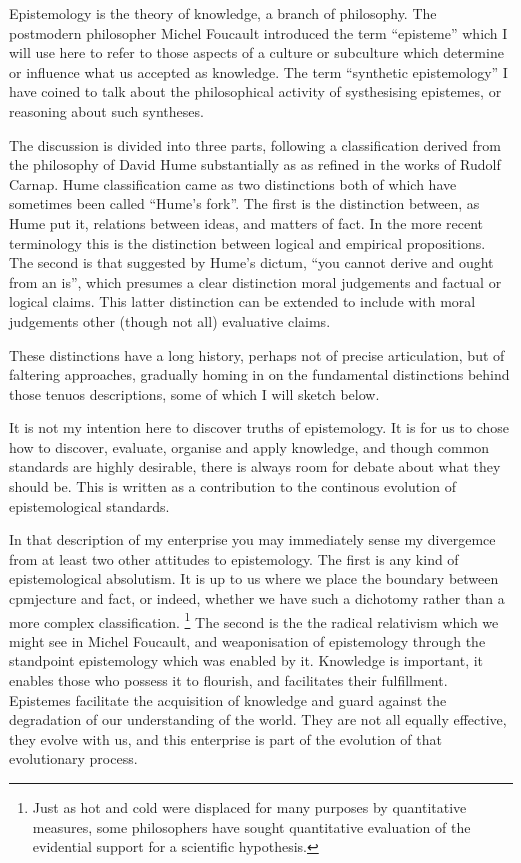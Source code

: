 \documentclass[10pt,titlepage]{article}
\begin{document}
Epistemology is the theory of knowledge, a branch of philosophy.
The postmodern philosopher Michel Foucault introduced the term ``episteme'' which I will use here to refer to those aspects of a culture or subculture which determine or influence what us accepted as knowledge.
The term ``synthetic epistemology'' I have coined to talk about the philosophical activity of systhesising epistemes, or reasoning about such syntheses.

The discussion is divided into three parts, following a classification derived from the philosophy of David Hume substantially as as refined in the works of Rudolf Carnap.
Hume classification came as two distinctions both of which have sometimes been called ``Hume's fork''.
The first is the distinction between, as Hume put it, relations between ideas, and matters of fact.
In the more recent terminology this is the distinction between logical and empirical propositions.
The second is that suggested by Hume's dictum, ``you cannot derive and ought from an is'', which presumes a clear distinction moral judgements and factual or logical claims.
This latter distinction can be extended to include with moral judgements other (though not all) evaluative claims.

These distinctions have a long history, perhaps not of precise articulation, but of faltering approaches, gradually homing in on the fundamental distinctions behind those tenuos descriptions, some of which I will sketch below.

It is not my intention here to discover truths of epistemology.
It is for us to chose how to discover, evaluate, organise and apply knowledge, and though common standards are highly desirable, there is always room for debate about what they should be.
This is written as a contribution to the continous evolution of epistemological standards.

In that description of my enterprise you may immediately sense my divergemce from at least two other attitudes to epistemology.
The first is any kind of epistemological absolutism.
It is up to us where we place the boundary between cpmjecture and fact, or indeed, whether we have such a dichotomy rather than a more complex classification.
\footnote{Just as hot and cold were displaced for many purposes by quantitative measures, some philosophers have sought quantitative evaluation of the evidential support for a scientific hypothesis.}
The second is the the radical relativism which we might see in Michel Foucault, and weaponisation of epistemology through the standpoint epistemology which was enabled by it.
Knowledge is important, it enables those who possess it to flourish, and facilitates their fulfillment.
Epistemes facilitate the acquisition of knowledge and guard against the degradation of our understanding of the world.
They are not all equally effective, they evolve with us, and this enterprise is part of the evolution of that evolutionary process.
\end{document}
